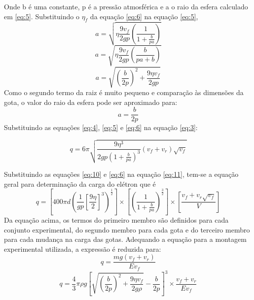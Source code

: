 Onde b é uma constante, p é a pressão atmosférica e a o raio da esfera calculado em \ref{eq:5}. Substituindo o $\eta_{f}$ da equação \ref{eq:6} na equação \ref{eq:5},
\begin{equation}
a= \sqrt{ \eta  \frac{9v_{f}}{2gp}  \left( \frac{1}{1+ \frac{b}{pa} } \right)}
\end{equation}
\begin{equation}
a= \sqrt{ \eta  \frac{9v_{f}}{2gp}  \left( \frac{b}{pa+b} \right)}
\end{equation}
\begin{equation}
a =  \sqrt{\left(\frac{b}{2p}\right)^2 +  \frac{9\eta v_{f}}{2gp} } 
\end{equation}
Como o segundo termo da raiz é muito pequeno e comparação às dimensões da gota, o valor do raio da esfera pode ser aproximado para:
\begin{equation}
a = \frac{b}{2p}
\label{eq:10}
\end{equation}
Substituindo as equações \ref{eq:4}, \ref{eq:5} e \ref{eq:6} na equação \ref{eq:3}:

\begin{equation}
q = 6\pi \sqrt{ \frac{9\eta^{3}}{2gp \left(1+ \frac{b}{pa} \right)^{3} } (v_{f} + v_{r})\sqrt{v_{f}}}
\label{eq:11}
\end{equation}

Substituindo as equações \ref{eq:10} e \ref{eq:6} na equação \ref{eq:11}, tem-se a equação geral para determinação da carga do elétron que é
\begin{equation}
q = \left[400\pi d \left(\frac{1}{gp}\left[\frac{9\eta}{2}\right]^{3}\right)^{\frac{1}{2}}\right] \times \left[\left(\frac{1}{1+\frac{b}{pa}}\right)^{\frac{3}{2}}\right] \times \left[\frac{v_{f}+v_{r}\sqrt{v_{f}}}{V}\right]
\end{equation}
Da equação acima, os termos do primeiro membro são definidos para cada conjunto experimental, do segundo membro para cada gota e do terceiro membro para cada mudança na carga das gotas.
Adequando a equação para a montagem experimental utilizada, a expressão é reduzida para:
\begin{equation}
q = \frac{mg(v_{f} + v_{r})}{Ev_{f}}
\end{equation}
\begin{equation}
q = \frac{4}{3} \pi \rho g \left[\sqrt{\left(\frac{b}{2p}\right)^{2} + \frac{9\eta v_{f}}{2g\rho}} - \frac{b}{2p} \right]^{3} \times \frac{v_{f} + v_{r}}{Ev_{f}}
\label{eq:14}
\end{equation}







	
